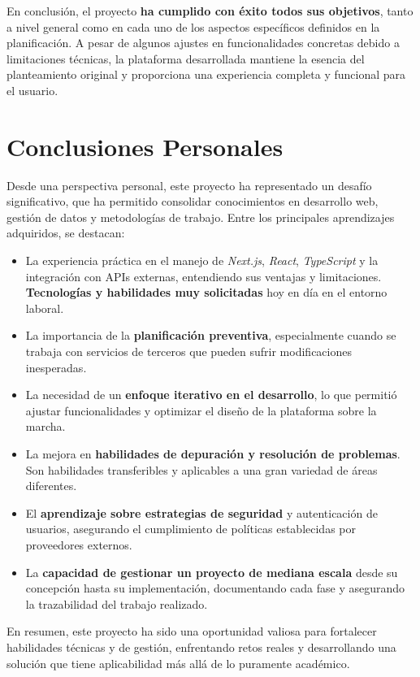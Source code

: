 En conclusión, el proyecto \textbf{ha cumplido con éxito todos sus objetivos}, tanto a nivel general como en cada uno de los aspectos específicos definidos en la planificación. A pesar de algunos ajustes en funcionalidades concretas debido a limitaciones técnicas, la plataforma desarrollada mantiene la esencia del planteamiento original y proporciona una experiencia completa y funcional para el usuario.

\section{Conclusiones Personales}

Desde una perspectiva personal, este proyecto ha representado un desafío significativo, que ha permitido consolidar conocimientos en desarrollo web, gestión de datos y metodologías de trabajo. Entre los principales aprendizajes adquiridos, se destacan:

\begin{itemize}
    \item La experiencia práctica en el manejo de \textit{Next.js}, \textit{React}, \textit{TypeScript} y la integración con APIs externas, entendiendo sus ventajas y limitaciones. \textbf{Tecnologías y habilidades muy solicitadas} hoy en día en el entorno laboral.
    \item La importancia de la \textbf{planificación preventiva}, especialmente cuando se trabaja con servicios de terceros que pueden sufrir modificaciones inesperadas.
    \item La necesidad de un \textbf{enfoque iterativo en el desarrollo}, lo que permitió ajustar funcionalidades y optimizar el diseño de la plataforma sobre la marcha.
    \item La mejora en \textbf{habilidades de depuración y resolución de problemas}. Son habilidades transferibles y aplicables a una gran variedad de áreas diferentes.
    \item El \textbf{aprendizaje sobre estrategias de seguridad} y autenticación de usuarios, asegurando el cumplimiento de políticas establecidas por proveedores externos.
    \item La \textbf{capacidad de gestionar un proyecto de mediana escala} desde su concepción hasta su implementación, documentando cada fase y asegurando la trazabilidad del trabajo realizado.
\end{itemize}

En resumen, este proyecto ha sido una oportunidad valiosa para fortalecer habilidades técnicas y de gestión, enfrentando retos reales y desarrollando una solución que tiene aplicabilidad más allá de lo puramente académico.

